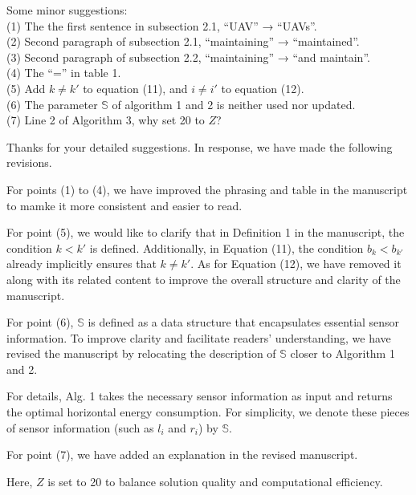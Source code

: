 \begin{revcomment}
	Some minor suggestions:\\
	(1) The the first sentence in subsection 2.1, ``UAV'' → ``UAVs''.\\
	(2) Second paragraph of subsection 2.1, ``maintaining'' → ``maintained''.\\
	(3) Second paragraph of subsection 2.2, ``maintaining'' → ``and maintain''.\\
	(4) The ``='' in table 1.\\
	(5) Add $k \neq k'$ to equation (11), and $i \neq i'$ to equation (12).\\
	(6) The parameter $\mathbb{S}$ of algorithm 1 and 2 is neither used nor updated.\\
	(7) Line 2 of Algorithm 3, why set 20 to $Z$?
\end{revcomment}
\begin{revresponse}
	Thanks for your detailed suggestions.
	In response, we have made the following revisions.

	For points (1) to (4), we have improved the phrasing and table in the manuscript to mamke it more consistent and easier to read.

	For point (5), we would like to clarify that in Definition 1 in the manuscript, the condition $k<k'$ is defined. Additionally, in Equation (11), the condition $b_k < b_{k'}$ already implicitly ensures that $k\neq k'$.
	As for Equation (12), we have removed it along with its related content to improve the overall structure and clarity of the manuscript.

	For point (6), $\mathbb{S}$ is defined as a data structure that encapsulates essential sensor information. To improve clarity and facilitate readers' understanding, we have revised the manuscript by relocating the description of $\mathbb{S}$ closer to Algorithm 1 and 2.
	\begin{changes}
		For details, Alg. 1 takes the necessary sensor information as input and returns the optimal horizontal energy consumption.
		For simplicity, we denote these pieces of sensor information (such as $l_i$ and $r_i$) by $\mathbb{S}$.
	\end{changes}

	For point (7), we have added an explanation in the revised manuscript.
	\begin{changes}
		Here, $Z$ is set to 20 to balance solution quality and computational efficiency.
	\end{changes}
\end{revresponse}

